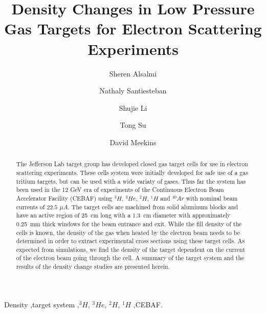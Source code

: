 \documentclass[final,5p,times,twocolumn]{elsarticle}
\begin{document}
\begin{frontmatter}



\title{Density Changes in Low Pressure Gas Targets for Electron Scattering Experiments}

\author[Kent]{Sheren Alsalmi}
\author[UNH]{Nathaly Santiesteban}
\author[UNH]{Shujie Li}
\author[Kent]{Tong Su}
\author[JLab]{David Meekins}

\address[Kent]{Kent State University}
\address[UNH]{University of New Hampshire}
\address[JLab]{Jefferson Lab}

\begin{abstract}
The Jefferson Lab target group has developed closed gas target cells for use in electron scattering experiments.  
These cells system were initially developed for
safe use of a gas tritium targets, but can be used with a wide variaty of gases.  Thus far the system has been used in the 12 GeV 
era of experiments of the Continuous Electron Beam Accelerator Facility (CEBAF) 
using $^{3}H$, $^{3}He$, $^{2}H$, $^{1}H$ and $^{40}Ar$ with nominal beam currents of 
$22.5$ $\mu A$.  The target cells are machined from solid  aluminum blocks and have an active region of 25~cm long with a 1.3~cm diameter 
with approximately 0.25~mm thick windows for the beam entrance and exit.   While the fill density of the cells is known, the density of the 
gas when heated by the electron beam needs to be determined in order to extract experimental cross sections using these target cells.  
As expected from simulations, we find the density of the target dependent on the current 
of the electron beam going through the cell.   A summary of the target system and the results of the density change studies
are presented herein.
\end{abstract}

\begin{keyword}
Density \sep target system
\sep $^{3}H$, $^{3}He$, $^{2}H$, $^{1}H$
\sep CEBAF.
\end{keyword}
\end{frontmatter}
\end{document}
